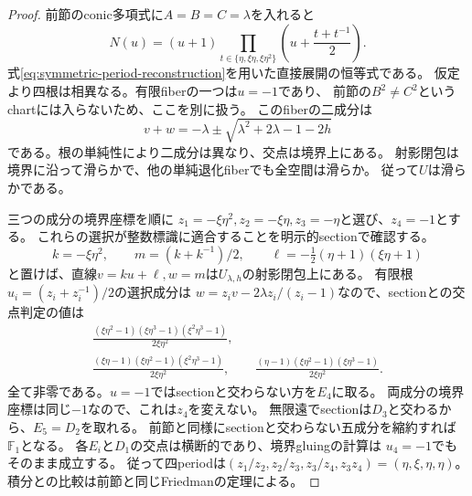 \begin{proof}
前節のconic多項式に$A=B=C=\lambda$を入れると
\begin{equation}\label{eq:symmetric-quartic-factor}
 N(u)=(u+1)\prod_{t\in\{\eta,\xi\eta,\xi\eta^2\}}
                     \left(u+\frac{t+t^{-1}}2\right).
\end{equation}
式\eqref{eq:symmetric-period-reconstruction}を用いた直接展開の恒等式である。
仮定より四根は相異なる。有限fiberの一つは$u=-1$であり、
前節の$B^2\ne C^2$というchartには入らないため、ここを別に扱う。
このfiberの二成分は
\[
 v+w=-\lambda\pm\sqrt{\lambda^2+2\lambda-1-2h}
\]
である。根の単純性により二成分は異なり、交点は境界上にある。
射影閉包は境界に沿って滑らかで、他の単純退化fiberでも全空間は滑らか。
従って$U$は滑らかである。

三つの成分の境界座標を順に
$z_1=-\xi\eta^2,z_2=-\xi\eta,z_3=-\eta$と選び、$z_4=-1$とする。
これらの選択が整数標識に適合することを明示的sectionで確認する。
\[
 k=-\xi\eta^2,\qquad m=(k+k^{-1})/2,\qquad
 \ell=-\tfrac12(\eta+1)(\xi\eta+1)
\]
と置けば、直線$v=ku+\ell,w=m$は$U_{\lambda,h}$の射影閉包上にある。
有限根$u_i=(z_i+z_i^{-1})/2$の選択成分は
$w=z_iv-2\lambda z_i/(z_i-1)$なので、sectionとの交点判定の値は
\begin{gather*}
 \frac{(\xi\eta^2-1)(\xi\eta^3-1)(\xi^2\eta^3-1)}{2\xi\eta^2},\\
 \frac{(\xi\eta-1)(\xi\eta^2-1)(\xi^2\eta^3-1)}{2\xi\eta^2},\qquad
 \frac{(\eta-1)(\xi\eta^2-1)(\xi\eta^3-1)}{2\xi\eta^2}.
\end{gather*}
全て非零である。$u=-1$ではsectionと交わらない方を$E_4$に取る。
両成分の境界座標は同じ$-1$なので、これは$z_4$を変えない。
無限遠でsectionは$D_3$と交わるから、$E_5=D_2$を取れる。
前節と同様にsectionと交わらない五成分を縮約すれば$\mathbb F_1$となる。
各$E_i$と$D_1$の交点は横断的であり、境界gluingの計算は
$u_4=-1$でもそのまま成立する。
従って四periodは$(z_1/z_2,z_2/z_3,z_3/z_4,z_3z_4)=(\eta,\xi,\eta,\eta)$。
積分との比較は前節と同じFriedmanの定理による。
\end{proof}

